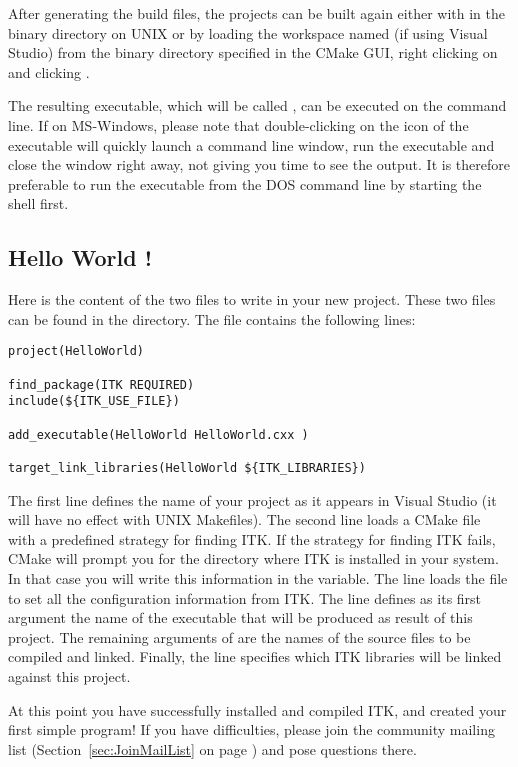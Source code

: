 After generating the build files, the projects can be built again either with
 in the binary directory on UNIX or by loading the
workspace named  (if using Visual Studio) from the binary
directory specified in the CMake GUI, right clicking on  and
clicking .

The resulting executable, which will be called , can be
executed on the command line. If on MS-Windows, please note that double-clicking
on the icon of the executable will quickly launch a command line window, run
the executable and close the window right away, not giving you time to see the
output. It is therefore preferable to run the executable from the DOS command
line by starting the  shell first.


\subsection{Hello World !}
\label{sec:HelloWorldITK}


Here is the content of the two files to write in your new project. These two
files can be found in the  directory. The
 file contains the following lines:

\begin{verbatim}
project(HelloWorld)

find_package(ITK REQUIRED)
include(${ITK_USE_FILE})

add_executable(HelloWorld HelloWorld.cxx )

target_link_libraries(HelloWorld ${ITK_LIBRARIES})
\end{verbatim}

The first line defines the name of your project as it appears in Visual
Studio (it will have no effect with UNIX Makefiles). The second line loads a CMake
file with a predefined strategy for finding ITK. If the strategy for finding ITK fails, CMake will prompt
you for the directory where ITK is installed in your system. In that case you
will write this information in the  variable. The line
 loads the  file to set
all the configuration information from ITK. The line 
defines as its first argument the name of the executable that will be produced
as result of this project. The remaining arguments of 
are the names of the source files to be compiled and linked.  Finally, the
 line specifies which ITK libraries will be
linked against this project.




At this point you have successfully installed and compiled ITK, and created
your first simple program! If you have difficulties, please join the
community mailing list (Section~\ref{sec:JoinMailList} on page
\pageref{sec:JoinMailList}) and pose questions there.
